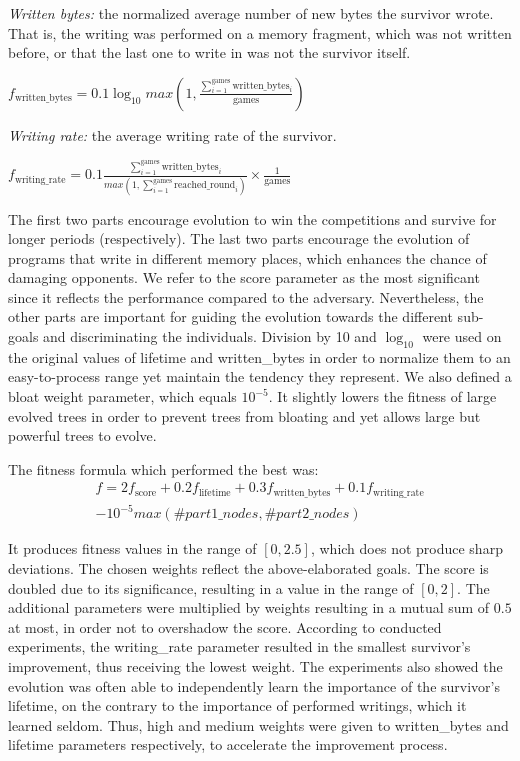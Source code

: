 \documentclass[dvipsnames, format=sigconf]{acmart}
\begin{document}
\textit{Written bytes:} the normalized average number of new bytes the survivor wrote. That is, the writing was performed on a memory fragment, which was not written before, or that the last one to write in was not the survivor itself.
\begin{center}
$f_{\text{written\_bytes}} = 0.1 \log_{10} max\left(1, \frac{\sum_{i=1}^{\text{games}} \text{written\_bytes}_i}{\text{games}}\right)$
\end{center}

\textit{Writing rate:} the average writing rate of the survivor.
\begin{center}
$f_{\text{writing\_rate}} = 0.1 \frac{\sum_{i=1}^{\text{games}} \text{written\_bytes}_i}{max\left(1, \sum_{i=1}^{\text{games}} \text{reached\_round}_i\right)} \times \frac{1}{\text{games}}$
\end{center}

The first two parts encourage evolution to win the competitions and survive for longer periods (respectively). The last two parts encourage the evolution of programs that write in different memory places, which enhances the chance of damaging opponents. We refer to the score parameter as the most significant since it reflects the performance compared to the adversary. Nevertheless, the other parts are important for guiding the evolution towards the different sub-goals and discriminating the individuals. Division by 10 and $\log_{10}$ were used on the original values of lifetime and written\_bytes in order to normalize them to an easy-to-process range yet maintain the tendency they represent. We also defined a bloat weight parameter, which equals $10^{-5}$. It slightly lowers the fitness of large evolved trees in order to prevent trees from bloating and yet allows large but powerful trees to evolve.

The fitness formula which performed the best was: 
\begin{equation*}
\begin{split}
  f = 2 f_{\text{score}} + 0.2 f_{\text{lifetime}} + 0.3 f_{\text{written\_bytes}} + 0.1 f_{\text{writing\_rate}} \\ - 10^{-5} max(\#part1\_nodes, \#part2\_nodes)  
\end{split}
\end{equation*}

It produces fitness values in the range of $[0, 2.5]$, which does not produce sharp deviations.
The chosen weights reflect the above-elaborated goals. The score is doubled due to its significance, resulting in a value in the range of $[0, 2]$. The additional parameters were multiplied by weights resulting in a mutual sum of $0.5$ at most, in order not to overshadow the score. According to conducted experiments, the writing\_rate parameter resulted in the smallest survivor's improvement, thus receiving the lowest weight. The experiments also showed the evolution was often able to independently learn the importance of the survivor's lifetime, on the contrary to the importance of performed writings, which it learned seldom. Thus, high and medium weights were given to written\_bytes and lifetime parameters respectively, to accelerate the improvement process.
\end{document}
